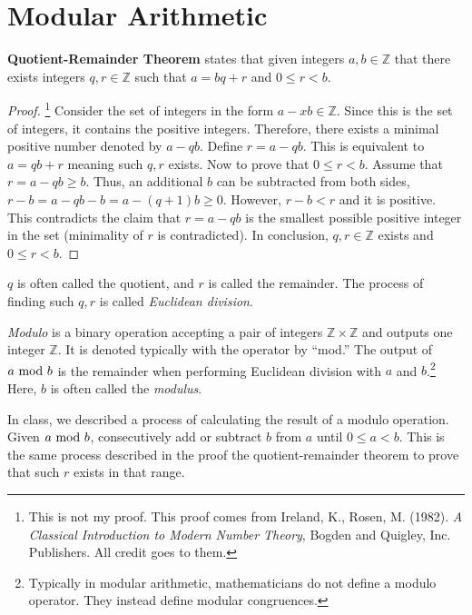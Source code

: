 \lecturechapter

\section*{Modular Arithmetic}

\begin{theorem}
    \textbf{Quotient-Remainder Theorem} states that given integers \(a,b\in\mathbb{Z}\) that there exists integers \(q,r\in\mathbb{Z}\) such that \(a=bq+r\) and \(0\le r<b\). 
\end{theorem}
\begin{proof}
    \footnote{This is not my proof. This proof comes from Ireland, K., Rosen, M. (1982). \emph{A Classical Introduction to Modern Number Theory}, Bogden and Quigley, Inc. 
    Publishers. All credit goes to them.} Consider the set of integers in the form \(a-xb\in\mathbb{Z}\). Since this is the set of integers, it contains the positive integers.
    Therefore, there exists a minimal positive number denoted by \(a-qb\). Define \(r=a-qb\). This is equivalent to \(a=qb+r\) meaning such \(q,r\) exists. Now to prove that
    \(0\le r<b\). Assume that \(r=a-qb\ge b\). Thus, an additional \(b\) can be subtracted from both sides, \(r-b=a-qb-b=a-(q+1)b\ge0\). However, \(r-b<r\) and it is positive.
    This contradicts the claim that \(r=a-qb\) is the smallest possible positive integer in the set (minimality of \(r\) is contradicted). In conclusion, \(q,r\in\mathbb{Z}\)
    exists and \(0\le r<b\).
\end{proof}

\(q\) is often called the quotient, and \(r\) is called the remainder. The process of finding such \(q,r\) is called \emph{Euclidean division}.
\bigskip
\begin{definition}
    \emph{Modulo} is a binary operation accepting a pair of integers \(\mathbb{Z}\times\mathbb{Z}\) and outputs one integer \(\mathbb{Z}\). It is denoted typically with the
    operator by ``mod.'' The output of \(a\text{ mod } b\) is the remainder when performing Euclidean division with \(a\) and \(b\).\footnote{Typically in modular arithmetic, mathematicians
    do not define a modulo operator. They instead define modular congruences.} Here, \(b\) is often called the \emph{modulus}.
\end{definition}

In class, we described a process of calculating the result of a modulo operation. Given \(a\text{ mod } b\), consecutively add or subtract \(b\) from \(a\) until \(0\le a<b\).
This is the same process described in the proof the quotient-remainder theorem to prove that such \(r\) exists in that range.

